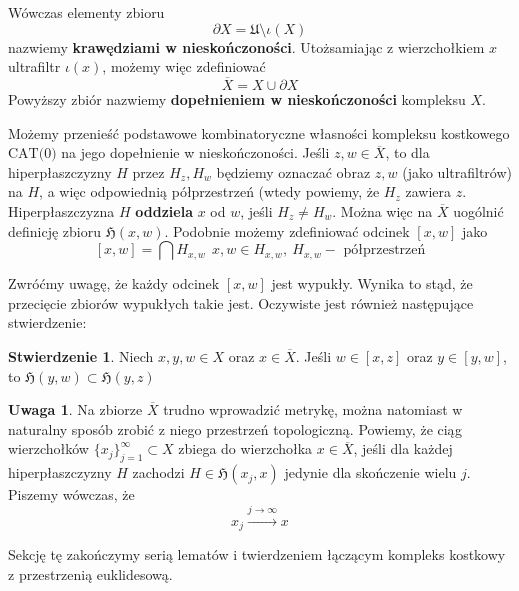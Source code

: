 \documentclass[licencjacka]{pracamgr}
\theoremstyle{definition}
\theoremstyle{definition}
\newtheorem{remark}{Uwaga}[section]
\theoremstyle{definition}
\newtheorem{proposition}{Stwierdzenie}[section]
\theoremstyle{definition}
\theoremstyle{definition}
\theoremstyle{plain}
\theoremstyle{plain}
\begin{document}
Wówczas elementy zbioru $$ \partial X = \mathfrak{U} \setminus \iota(X) $$
nazwiemy \textbf{krawędziami w nieskończoności}. Utożsamiając z wierzchołkiem $ x $ 
ultrafiltr $ \iota(x) $, możemy więc zdefiniować
$$ \overline{X} = X \cup \partial X $$
Powyższy zbiór nazwiemy \textbf{dopełnieniem w nieskończoności} kompleksu $ X $.

Możemy przenieść podstawowe kombinatoryczne własności 
kompleksu kostkowego $ \text{CAT(0)}$ 
na jego dopełnienie w nieskończoności. Jeśli $ z,w \in \overline{X} $, to dla 
hiperpłaszczyzny $ H $ przez $ H_z, H_w $ będziemy oznaczać obraz $ z,w $ 
(jako ultrafiltrów) na 
$ H $, a więc odpowiednią półprzestrzeń (wtedy powiemy, że $ H_z $ zawiera $ z $. 
Hiperpłaszczyzna $ H $ \textbf{oddziela} $ x $ od $ w $, 
jeśli $ H_z \neq H_w $. Można więc na $ \overline{X} $ uogólnić definicję zbioru 
$ \mathfrak{H}(x,w)$. Podobnie możemy zdefiniować odcinek $ [x,w] $ jako 
$$ [x,w] = \bigcap H_{x,w}  ~~ x,w \in H_{x,w}, ~ H_{x,w} - \text{ półprzestrzeń}$$

Zwróćmy uwagę, że każdy odcinek $ [x,w] $ jest wypukły. Wynika to stąd, że przecięcie 
zbiorów wypukłych takie jest. Oczywiste jest również następujące stwierdzenie: 

\begin{proposition}
	Niech $ x,y,w \in X $ oraz $ x \in \overline{X} $. Jeśli $ w \in [x,z] $ oraz 
	$ y \in [y,w] $, to $ \mathfrak{H}(y,w) \subset \mathfrak{H}(y,z)$
\end{proposition}

\begin{remark}
	Na zbiorze $ \overline{X} $ trudno wprowadzić metrykę, można natomiast w naturalny 
	sposób zrobić z niego przestrzeń topologiczną. Powiemy, że ciąg wierzchołków 
	$ \{x_j\}_{j = 1}^{\infty} \subset X $ zbiega do wierzchołka $ x \in \overline{X} $, jeśli 
	dla każdej hiperpłaszczyzny $ H $ zachodzi $ H \in \mathfrak{H}(x_j, x) $ jedynie 
	dla skończenie wielu $ j $. Piszemy wówczas, że $$ x_j 
	\xrightarrow{j \rightarrow \infty} x $$
\end{remark}

Sekcję tę zakończymy serią lematów i twierdzeniem łączącym kompleks 
kostkowy z przestrzenią euklidesową.
\end{document}
